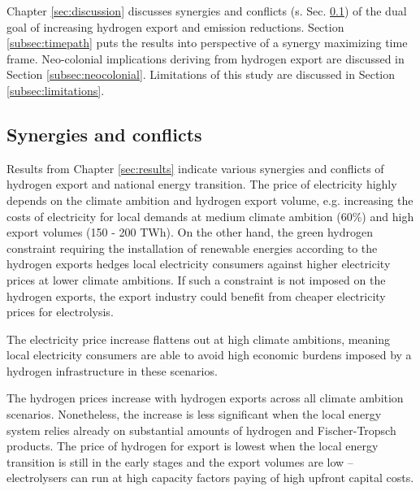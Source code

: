 Chapter \ref{sec:discussion} discusses synergies and conflicts (s. Sec. \ref{subsec:synergies-conflicts}) of the dual goal of increasing hydrogen export and emission reductions. Section \ref{subsec:timepath} puts the results into perspective of a synergy maximizing time frame. Neo-colonial implications deriving from hydrogen export are discussed in Section \ref{subsec:neocolonial}.
Limitations of this study are discussed in Section \ref{subsec:limitations}.



\subsection{Synergies and conflicts}
\label{subsec:synergies-conflicts}
Results from Chapter \ref{sec:results} indicate various synergies and conflicts of hydrogen export and national energy transition. The price of electricity highly depends on the climate ambition and hydrogen export volume, e.g. increasing the costs of electricity for local demands at medium climate ambition (60\%) and high export volumes (150 - 200 TWh). On the other hand, the green hydrogen constraint requiring the installation of renewable energies according to the hydrogen exports hedges local electricity consumers against higher electricity prices at lower climate ambitions. If such a constraint is not imposed on the hydrogen exports, the export industry could benefit from cheaper electricity prices for electrolysis.

The electricity price increase flattens out at high climate ambitions, meaning local electricity consumers are able to avoid high economic burdens imposed by a hydrogen infrastructure in these scenarios.

The hydrogen prices increase with hydrogen exports across all climate ambition scenarios. Nonetheless, the increase is less significant when the local energy system relies already on substantial amounts of hydrogen and Fischer-Tropsch products. The price of hydrogen for export is lowest when the local energy transition is still in the early stages and the export volumes are low -- electrolysers can run at high capacity factors paying of high upfront capital costs. 


